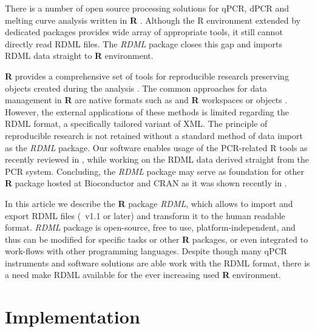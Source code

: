 \documentclass{bioinfo}
\begin{document}
	There is a number of open source processing solutions for qPCR, dPCR and melting curve 
	analysis written in \textbf{R} \cite{pabinger_2014, ritz_qpcr_2008, roediger_RJ_2013, 
	roediger2015chippcr}. Although the R environment extended by 
	dedicated packages provides wide array of appropriate tools, it still cannot 
	directly read RDML files. The \textit{RDML} package closes this gap and imports 
	RDML data straight to \textbf{R} environment.
	
	\textbf{R} provides a comprehensive set of tools for reproducible 
	research preserving objects created during the analysis 
	\cite{roediger2015r,roediger2015chippcr}. The common approaches for data 
	management in \textbf{R} are native formats such as and \textbf{R} 
	workspaces or objects \cite{roediger_rkward_2012}. However, the external 
	applications of these methods is limited regarding the RDML format, a 
	specifically tailored variant of XML. The principle of reproducible research is 
	not retained without a standard method of data import as the \textit{RDML} 
	package. Our software enables usage of the PCR-related R tools as recently 
	reviewed in \cite{pabinger_2014}, while working on the RDML data derived 
	straight from the PCR system. Concluding, the \textit{RDML} package may serve as 
	foundation for other \textbf{R} package hosted at Bioconductor 
	\cite{gentleman_2004} and CRAN as it was shown recently in \cite{roediger2015r}.
	
	In this article we describe the \textbf{R} package \textit{RDML}, which allows to
	import and export RDML files (~v1.1 or later) and transform it to the
	human readable format. \textit{RDML} package is open-source, free to use,
	platform-independent, and thus can be modified for specific tasks or other
	\textbf{R} packages, or even integrated to work-flows with other programming
	languages. Despite though many qPCR instruments and software solutions are able
	work with the RDML format, there is a need make RDML available for the ever
	increasing used \textbf{R} environment.
	
	\section{Implementation}
	
\end{document}
